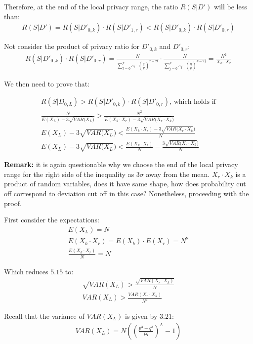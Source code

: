 \documentclass[11pt,draft]{article}
\begin{document}
Therefore,  at the end of the local privacy range, the ratio $R(S|D')$ will be less than:
\begin{align}
 R(S|D') = R(S|D'_{0,k}) \cdot R(S|D'_{1,r}) <  R(S|D'_{0,k}) \cdot R(S|D'_{0,r}) 
\end{align}

Not consider the product of privacy ratio for $D'_{0,k}$ and $D'_{0,r}$:
\begin{align}
 R(S|D'_{0,k}) \cdot R(S|D'_{0,r}) = \frac{N}{ \sum_{t=0}^{r}  s_t \cdot \left ( \frac{q}{p} \right )^{r-2t} }  \cdot \frac{N}{ \sum_{j=0}^{k}  s_j \cdot \left ( \frac{q}{p} \right )^{k-2j}} = \frac{N^2}{X_k \cdot X_r}
\end{align}

We then need to prove that:

\begin{align}
R(S|D_{0,L}) >  R(S|D'_{0,k}) \cdot R(S|D'_{0,r}) \text{, which holds if} \\
\frac{N}{E(X_L) - 3\sqrt{VAR(X_L})}  >   \frac{N^2}{E(X_k \cdot X_r) - 3\sqrt{VAR(X_r\cdot X_k})} \\
E(X_L) - 3\sqrt{VAR(X_L})  < \frac{   E(X_k \cdot X_r) - 3\sqrt{VAR(X_r\cdot X_k})  }{N}  \\
E(X_L) - 3\sqrt{VAR(X_L})  <  \frac{ E(X_k \cdot X_r)}{N} - \frac{3\sqrt{VAR(X_r\cdot X_k})  }{N}
\end{align}

\textbf{Remark: }  it is again questionable why we choose the end of the local privacy range for the right side of the inequality as $3\sigma$ away from the mean.  $X_r \cdot X_k$ is a product of random variables, does it have same shape, how does probability cut off correspond to deviation cut off in this case?  Nonetheless, proceeding with the proof.

First consider the expectations:
 \begin{align}
E(X_L) = N \\
E(X_k \cdot X_r) = E(X_k) \cdot E(X_r) = N^2 \\
 \frac{ E(X_k \cdot X_r)}{N} = N
\end{align}

Which reduces $5.15$ to:
 \begin{align}
\sqrt{VAR(X_L)}  >  \frac{\sqrt{VAR(X_r\cdot X_k)}  }{N} \\
VAR(X_L) >  \frac{VAR(X_r\cdot X_k)  }{N^2} 
\end{align}

Recall that the variance of $VAR(X_L)$  is given by $3.21$:
 \begin{align}
VAR(X_L) = N   \left (  \left ( \frac{p^3 + q^3}{pq} \right )^L - 1 \right )
 \end{align}
 
\end{document}
